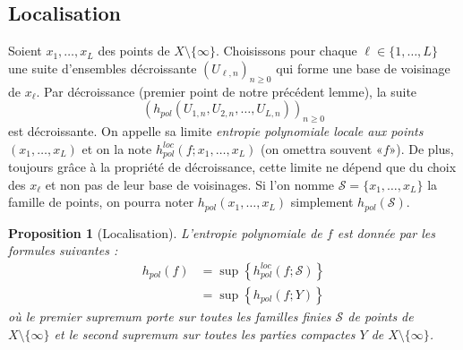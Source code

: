 \documentclass[11pt]{article}
\providecommand{\og}{«\nobreakspace}
\providecommand{\fg}{\nobreakspace»}
\newtheorem{prop}[theo]{Proposition}
\theoremstyle{definition}
\numberwithin{equation}{section}
\numberwithin{figure}{section}
\numberwithin{table}{section}
\newcommand*\cS{{\mathcal S}}
\begin{document}
\subsection{Localisation}\label{ss.localization}

Soient $x_{1}, \dots, x_{L}$ des points de $X \setminus \{\infty\}$. Choisissons pour chaque $\ell \in \{1,\dots,L\}$ une suite d'ensembles décroissante $(U_{\ell, n})_{n \geq 0}$ qui forme une base de voisinage de $x_{\ell}$. Par décroissance (premier point de notre précédent lemme), la suite
\[
\left(h_{pol}(U_{1,n},U_{2,n}, \dots, U_{L,n})\right)_{n \geq 0}
\]
est décroissante. On appelle sa limite \emph{entropie polynomiale locale aux points $(x_{1}, \dots, \allowbreak x_{L})$} et on la note $h^{loc}_{pol}(f;x_{1}, \dots, x_{L})$ (on omettra souvent \og$f$\fg). De plus, {toujours grâce à la propriété de décroissance,} cette limite ne dépend que du choix des $x_{\ell}$ et non pas de leur base de voisinages. Si l'on nomme $\cS = \{x_{1}, \dots, x_{L}\}$ la famille de points, on pourra noter $h_{pol}(x_{1}, \dots, x_{L})$ simplement $h_{pol}(\cS)$.


\begin{prop}[Localisation]\label{prop.localization}
L'entropie polynomiale de $f$ est donnée par les formules suivantes :
\begin{align*}
h_{pol}(f) & = \sup\left\{h^{loc}_{pol}(f;\cS)\right\} \\
&= \sup \left\{ h_{pol}(f;Y)\right\}
\end{align*}
où le premier supremum porte sur toutes les familles finies $\cS$ de points de $X\setminus \{\infty\}$ et le second supremum sur {toutes les parties compactes} $Y$ de $X\setminus \{\infty\}$.
\end{prop}
\end{document}
